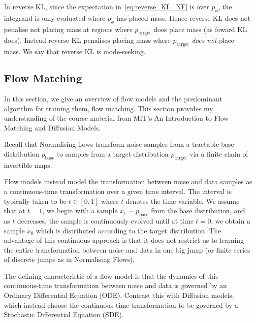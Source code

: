 \documentclass[12pt,a4paper]{report}
\begin{document}
In reverse KL, since the expectation in~\ref{eq:reverse_KL_NF} is over $p_\phi$, the integrand is only evaluated where $p_\phi$ has placed mass. Hence reverse KL does not penalise not placing mass at regions where $p_\text{target}$ does place mass (as foward KL does). Instead reverse KL penalises placing mass where $p_\text{target}$ \textit{does not} place mass. We say that reverse KL is mode-seeking. 


\subsection{Flow Matching}

In this section, we give an overview of flow models and the predominant algorithm for training them, flow matching. This section provides my understanding of the course material from MIT's An Introduction to Flow Matching and Diffusion Models. 

Recall that Normalising flows transform noise samples from a tractable base distribution $p_\text{base}$ to samples from a target distribution $p_\text{target}$ via a finite chain of invertible maps. 

Flow models instead model the transformation between noise and data samples as a continuous-time transformation over a given time interval. The interval is typically taken to be $t \in [0,1]$ where $t$ denotes the time variable. We assume that at $t=1$, we begin with a sample $x_1 \sim p_\text{base}$ from the base distribution, and as $t$ decreases, the sample is continuously evolved until at time $t=0$, we obtain a sample $x_0$ which is distributed according to the target distribution. The advantage of this continuous approach is that it does not restrict us to learning the entire transformation between noise and data in one big jump (or finite series of discrete jumps as in Normalising Flows). 

The defining characteristic of a flow model is that the dynamics of this continuous-time transformation between noise and data is governed by an Ordinary Differential Equation (ODE). Contrast this with Diffusion models, which instead choose the continuous-time transformation to be governed by a Stochastic Differential Equation (SDE). 
\end{document}
